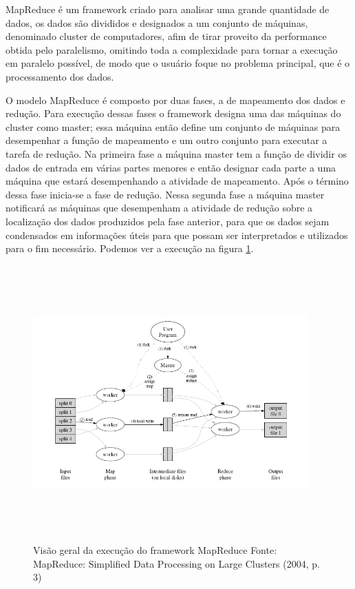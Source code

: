 \documentclass[a4paper,12pt]{article}
\begin{document}
MapReduce é um framework criado para analisar uma grande quantidade de dados, 
os dados são divididos e designados a um conjunto de máquinas, denominado
cluster de computadores, afim de tirar proveito da performance obtida
pelo paralelismo, omitindo toda a complexidade para tornar a execução em
paralelo possível, de modo que o usuário foque no problema principal, que é o
processamento dos dados.

O modelo MapReduce é composto por duas fases, a de mapeamento dos dados e
redução. Para execução dessas fases o framework designa uma das
máquinas do cluster como master; essa máquina então define um conjunto de
máquinas para desempenhar a função de mapeamento e um outro conjunto para
executar a tarefa de redução. Na primeira fase a máquina master tem a função de
dividir os dados de entrada em várias partes menores e então designar cada parte
a uma máquina que estará desempenhando a atividade de mapeamento. Após o término
dessa fase inicia-se a fase de redução. Nessa segunda fase a máquina master
notificará as máquinas que desempenham a atividade de redução sobre a
localização dos dados produzidos pela fase anterior, para que os dados sejam
condensados em informações úteis para que possam ser interpretados e utilizados
para o fim necessário. Podemos ver a execução na figura \ref{MapReduce}.

\begin{figure}[ht]
  \centering
  \includegraphics[width=400px,height=400px]{img/mapreduce.png}
  \caption{Visão geral da execução do framework MapReduce\newline
  Fonte: MapReduce: Simplified Data Processing on Large Clusters (2004, p. 3)}
  \label{MapReduce}
\end{figure}
\end{document}
